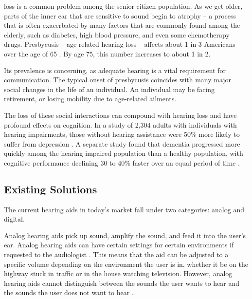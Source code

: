 \documentclass[10pt,journal,compsoc]{IEEEtran}
\begin{document}
%
%
%
%
 loss is a common problem among the senior citizen population. As we get older, parts of the inner ear that are sensitive to sound begin to atrophy – a process that is often exacerbated by many factors that are commonly found among the elderly, such as diabetes, high blood pressure, and even some chemotherapy drugs.  Presbycusis – age related hearing loss – affects about 1 in 3 Americans over the age of 65 \cite{hl_nih}. By age 75, this number increases to about 1 in 2.

Its prevalence is concerning, as adequate hearing is a vital requirement for communication. The typical onset of presbycusis coincides with many major social changes in the life of an individual. An individual may be facing retirement, or losing mobility due to age-related ailments.

The loss of these social interactions can compound with hearing loss and have profound effects on cognition. In a study of 2,304 adults with individuals with hearing impairments, those without hearing assistance were 50\% more likely to suffer from depression \cite{myers}. A separate study found that dementia progressed more quickly among the hearing impaired population than a healthy population, with cognitive performance declining 30 to 40\% faster over an equal period of time \cite{lin}.


\subsection{Existing Solutions}
The current hearing aids in today’s market fall under two categories: analog and digital.

Analog hearing aids pick up sound, amplify the sound, and feed it into the user’s ear. Analog hearing aids can have certain settings for certain environments if requested to the audiologist \cite{hearing_aids}. This means that the aid can be adjusted to a specific volume depending on the environment the user is in, whether it be on the highway stuck in traffic or in the house watching television. However, analog hearing aids cannot distinguish between the sounds the user wants to hear and the sounds the user does not want to hear \cite{hearing_aids}.
\end{document}
